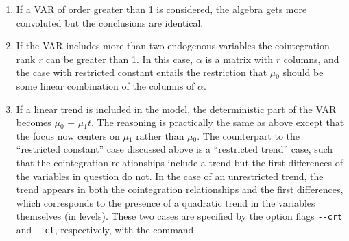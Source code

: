 \begin{enumerate}
\item 
	  If a VAR of order greater than 1 is considered, the algebra gets
	  more convoluted but the conclusions are identical.
	
\item 
	  If the VAR includes more than two endogenous variables the
	  cointegration rank $r$ can be greater than 1. In
	  this case, $\alpha$ is a matrix with $r$ columns,
	  and the case with restricted constant entails the restriction that
	  $\mu$\ensuremath{_{0}} should be some linear combination of the
	  columns of $\alpha$.
	
\item 
	  If a linear trend is included in the model, the deterministic part of
	  the VAR becomes $\mu$\ensuremath{_{0}} +
	  $\mu$\ensuremath{_{1}}$t$. The reasoning is
	  practically the same as above except that the focus now centers on
	  $\mu$\ensuremath{_{1}} rather than $\mu$\ensuremath{_{0}}.
	  The counterpart to the ``restricted constant'' case
	  discussed above is a ``restricted trend'' case, such that
	  the cointegration relationships include a trend but the first
	  differences of the variables in question do not. In the case of an
	  unrestricted trend, the trend appears in both the cointegration
	  relationships and the first differences, which corresponds to the
	  presence of a quadratic trend in the variables themselves (in levels).
	  These two cases are specified by the option flags
	  \verb+--crt+ and \verb+--ct+, respectively,
	  with the  command.
	
\end{enumerate}



